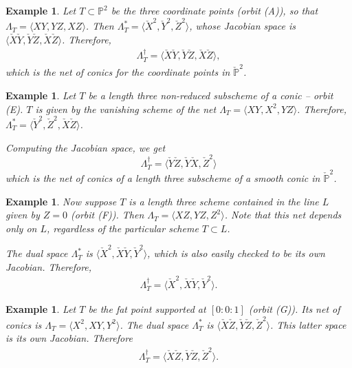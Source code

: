 \documentclass[reqno, 11pt]{amsart}
\theoremstyle{plain}
\newtheorem{example}[theorem]{Example}
\theoremstyle{remark}
\renewcommand{\P}{\mathbb{P}}
\begin{document}
\begin{example}
  \label{example:coordinatepoints}
  Let $T \subset \P^{2}$ be the three coordinate points (orbit (A)), so that
  $\Lambda_{T} = \langle XY, YZ, XZ \rangle $. Then
  $\Lambda_{T}^{*} = \langle \check{X}^{2}, \check{Y}^{2}, \check{Z}^{2} \rangle $, whose
  Jacobian space is $\langle \check{X}\check{Y}, \check{Y}\check{Z}, \check{X}\check{Z} \rangle
  $.   Therefore,
  \begin{eqnarray*}
    \Lambda_{T}^{\dagger} = \langle \check{X}\check{Y}, \check{Y}\check{Z}, \check{X}\check{Z} \rangle, 
  \end{eqnarray*}
  which is the net of conics for the coordinate points in $\check{\P}^{2}$.
\end{example}

\begin{example}
    \label{example:curvillinearconic} Let $T$ be a length three non-reduced subscheme of a conic -- orbit (E).  $T$ is given by the vanishing scheme of the net $\Lambda_{T} = \langle XY, X^{2}, YZ \rangle$. Therefore, $\Lambda^{*}_{T} = \langle \check{Y}^{2}, \check{Z}^{2}, \check{X}\check{Z} \rangle$.  

    Computing the Jacobian space, we get $$\Lambda_{T}^{\dagger} = \langle \check{Y}\check{Z}, \check{Y}\check{X}, \check{Z}^{2} \rangle$$ which is the net of conics of a length three subscheme of a smooth conic in $\check{\P}^{2}$. 
\end{example}


\begin{example}
    \label{example:collinearZnet}
    Now suppose $T$ is a length three scheme contained in the line
    $L$ given by $Z=0$ (orbit (F)).  Then
    $\Lambda_{T} = \langle XZ, YZ, Z^{2} \rangle$.  Note that this net depends only on $L$, regardless of the particular
    scheme $T \subset L$.
  
    The dual space $\Lambda_{T}^{*}$ is
    $\langle \check{X}^{2},\check{X}\check{Y}, \check{Y}^{2} \rangle$, which is also easily checked to
    be its own Jacobian. Therefore,
    \begin{eqnarray*}
      \Lambda_{T}^{\dagger} = \langle \check{X}^{2}, \check{X}\check{Y}, \check{Y}^{2} \rangle.
    \end{eqnarray*}
    
  \end{example}

\begin{example}
  \label{example:fatpointZnet}
  Let $T$ be the fat point supported at $[0:0:1]$ (orbit (G)).  Its net of
  conics is $\Lambda_{T} = \langle X^{2}, XY, Y^{2}\rangle$. The dual
  space $\Lambda_{T}^{*}$ is $\langle \check{X}\check{Z}, \check{Y}\check{Z}, \check{Z}^{2} \rangle$. This
  latter space is its own Jacobian. Therefore
  \begin{eqnarray*}
    \Lambda_{T}^{\dagger} = \langle \check{X}\check{Z}, \check{Y}\check{Z}, \check{Z}^{2} \rangle.
  \end{eqnarray*}
  
\end{example}
\end{document}
